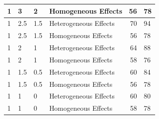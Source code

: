 \documentclass[
]{article}
\begin{document}
\begin{table}[H]
\begin{tabular}{l|l|l|l|r|l}
\hline
\hspace{1em}1 & 3 & 2 & Homogeneous Effects & 56 & 78\\
\hline
\hspace{1em}1 & 2.5 & 1.5 & Heterogeneous Effects & 70 & 94\\
\hline
\hspace{1em}1 & 2.5 & 1.5 & Homogeneous Effects & 56 & 78\\
\hline
\hspace{1em}1 & 2 & 1 & Heterogeneous Effects & 64 & 88\\
\hline
\hspace{1em}1 & 2 & 1 & Homogeneous Effects & 58 & 76\\
\hline
\hspace{1em}1 & 1.5 & 0.5 & Heterogeneous Effects & 60 & 84\\
\hline
\hspace{1em}1 & 1.5 & 0.5 & Homogeneous Effects & 56 & 78\\
\hline
\hspace{1em}1 & 1 & 0 & Heterogeneous Effects & 60 & 80\\
\hline
\hspace{1em}1 & 1 & 0 & Homogeneous Effects & 58 & 78\\
\hline
\end{tabular}
\end{table}
\end{document}
